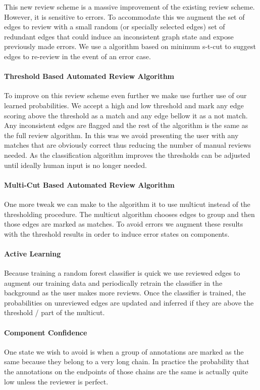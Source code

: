 This new review scheme is a massive improvement of the existing review scheme.
However, it is sensitive to errors.
To accommodate this we augment the set of edges to review with a small random
  (or specially selected edges) set of redundant edges that could induce an
  inconsistent graph state and expose previously made errors.
We use a algorithm based on minimum s-t-cut to suggest edges to re-review in
  the event of an error case.


\paragraph{Threshold Based Automated Review Algorithm}

To improve on this review scheme even further we make use further use of our
  learned probabilities.
We accept a high and low threshold and mark any edge scoring above the
  threshold as a match and any edge bellow it as a not match.
Any inconsistent edges are flagged and the rest of the algorithm is the same
  as the full review algorithm.
In this was we avoid presenting the user with any matches that are obviously
  correct thus reducing the number of manual reviews needed.
As the classification algorithm improves the thresholds can be adjusted until
  ideally human input is no longer needed.


\paragraph{Multi-Cut Based Automated Review Algorithm}

One more tweak we can make to the algorithm it to use multicut instead of the
thresholding procedure.  The multicut algorithm chooses edges to group and then
those edges are marked as matches. To avoid errors we augment these results
with the threshold results in order to induce error states on components.


\paragraph{Active Learning}
Because training a random forest classifier is quick we use reviewed edges to augment 
our training data and periodically retrain the classifier in the background as
the user makes more reviews. Once the classifier is trained, the probabilities
on unreviewed edges are updated and inferred if they are above the threshold / part of the multicut.


\paragraph{Component Confidence}
One state we wish to avoid is when a group of annotations are marked as the
  same because they belong to a very long chain.
In practice the probability that the annotations on the endpoints of those
  chains are the same is actually quite low unless the reviewer is perfect.

